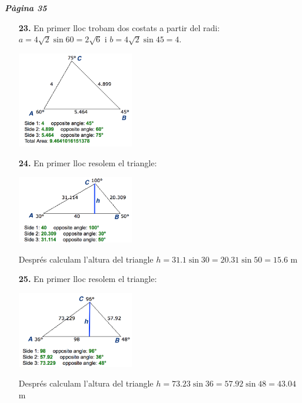 \documentclass[a4paper, pdf, twoside]{book}
\begin{document}
\begin{multicols}{2}

{\textbf{\em Pàgina 35}} \hrulefill
\begin{enumerate}
\vspace{0.25cm}
\item[\fontfamily{phv}\selectfont\color{blue}\textbf{23. }] 
En primer lloc trobam dos costats a partir del radi: $a=4\sqrt {2}\sin 60=2\sqrt {6}$ i $b=4\sqrt {2} \sin 45 = 4$.\par \includegraphics [width=0.4\textwidth ]{img-sol/t3-23}
 \end{enumerate}
\begin{enumerate}
\vspace{0.25cm}
\item[\fontfamily{phv}\selectfont\color{blue}\textbf{24. }] 
En primer lloc resolem el triangle:\par \includegraphics [width=0.4\textwidth ]{img-sol/t3-24}\par Després calculam l'altura del triangle $h=31.1\sin 30=20.31\sin 50=15.6$ m
\vspace{0.25cm}
\item[\fontfamily{phv}\selectfont\color{blue}\textbf{25. }] 
En primer lloc resolem el triangle:\par \includegraphics [width=0.4\textwidth ]{img-sol/t3-25}\par Després calculam l'altura del triangle $h=73.23\sin 36=57.92\sin 48=43.04$ m

\end{enumerate}
\end{multicols}
\end{document}
